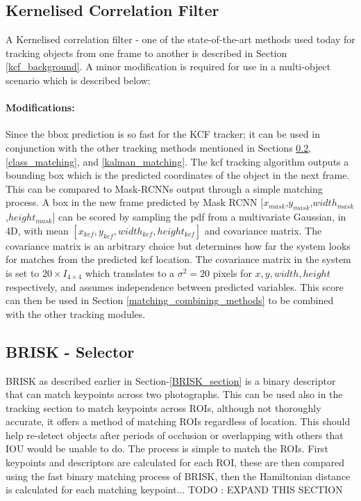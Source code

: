 \documentclass[11pt,twoside]{report}
\begin{document}
\subsection{Kernelised Correlation Filter}
A Kernelised correlation filter - one of the state-of-the-art methods used today for tracking objects from one frame to another is described in Section \ref{kcf_background}. A minor modification is required for use in a multi-object scenario which is described below:

\paragraph{Modifications:}
Since the bbox prediction is so fast for the KCF tracker; it can be used in conjunction with the other tracking methods mentioned in Sections \ref{BRISK_matching}, \ref{class_matching}, and \ref{kalman_matching}. The kcf tracking algorithm outputs a bounding box which is the predicted coordinates of the object in the next frame. This can be compared to Mask-RCNNs output through a simple matching process. A box in the new frame predicted by Mask RCNN $[x_{mask}$,$y_{mask}$,$width_{mask}$,$height_{mask}]$ can be scored by sampling the pdf from a multivariate Gaussian, in 4D, with mean $[x_{kcf},y_{kcf},width_{kcf},height_{kcf}]$ and covariance matrix. The covariance matrix is an arbitrary choice but determines how far the system looks for matches from the predicted kcf location. The covariance matrix in the system is set to $20 \times I_{4 \times 4}$ which translates to a $\sigma^{2} = 20$ pixels for $x,y,width,height$ respectively, and assumes independence between predicted variables. This score can then be used in Section \ref{matching_combining_methods} to be combined with the other tracking modules.


\subsection{BRISK - Selector} \label{BRISK_matching}
BRISK as described earlier in Section-\ref{BRISK_section} is a binary descriptor that can match keypoints across two photographs. This can be used also in the tracking section to match keypoints across ROIs, although not thoroughly accurate, it offers a method of matching ROIs regardless of location. This should help re-detect objects after periods of occlusion or overlapping with others that IOU would be unable to do. The process is simple to match the ROIs. First keypoints and descriptors are calculated for each ROI, these are then compared using the fast binary matching process of BRISK, then the Hamiltonian distance is calculated for each matching keypoint...
TODO : EXPAND THIS SECTION
\end{document}
